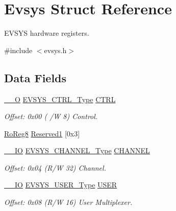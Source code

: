\hypertarget{struct_evsys}{}\section{Evsys Struct Reference}
\label{struct_evsys}


E\+V\+S\+YS hardware registers.  




{\ttfamily \#include $<$evsys.\+h$>$}

\subsection*{Data Fields}
\begin{DoxyCompactItemize}
\item 
\mbox{\hyperlink{core__cm0plus_8h_a7e25d9380f9ef903923964322e71f2f6}{\+\_\+\+\_\+O}} \mbox{\hyperlink{union_e_v_s_y_s___c_t_r_l___type}{E\+V\+S\+Y\+S\+\_\+\+C\+T\+R\+L\+\_\+\+Type}} \mbox{\hyperlink{struct_evsys_a2ef48ff0b6163d7c435c792a85e4d284}{C\+T\+RL}}
\begin{DoxyCompactList}\small\item\em Offset\+: 0x00 ( /W 8) Control. \end{DoxyCompactList}\item 
\mbox{\hyperlink{group___s_a_m_d21_e15_a__definitions_ga0d957f1433aaf5d70e4dc2b68288442d}{Ro\+Reg8}} \mbox{\hyperlink{struct_evsys_a0ec4ccebd5bfbf4f17510e15a5a9ff81}{Reserved1}} \mbox{[}0x3\mbox{]}
\item 
\mbox{\hyperlink{core__cm0plus_8h_aec43007d9998a0a0e01faede4133d6be}{\+\_\+\+\_\+\+IO}} \mbox{\hyperlink{union_e_v_s_y_s___c_h_a_n_n_e_l___type}{E\+V\+S\+Y\+S\+\_\+\+C\+H\+A\+N\+N\+E\+L\+\_\+\+Type}} \mbox{\hyperlink{struct_evsys_a5fa220a46e9b6e08f41529e5cc12825b}{C\+H\+A\+N\+N\+EL}}
\begin{DoxyCompactList}\small\item\em Offset\+: 0x04 (R/W 32) Channel. \end{DoxyCompactList}\item 
\mbox{\hyperlink{core__cm0plus_8h_aec43007d9998a0a0e01faede4133d6be}{\+\_\+\+\_\+\+IO}} \mbox{\hyperlink{union_e_v_s_y_s___u_s_e_r___type}{E\+V\+S\+Y\+S\+\_\+\+U\+S\+E\+R\+\_\+\+Type}} \mbox{\hyperlink{struct_evsys_a27876e11f29a0ad0f8a690b9fe80773a}{U\+S\+ER}}
\begin{DoxyCompactList}\small\item\em Offset\+: 0x08 (R/W 16) User Multiplexer. \end{DoxyCompactList}\item 

\end{DoxyCompactItemize}
